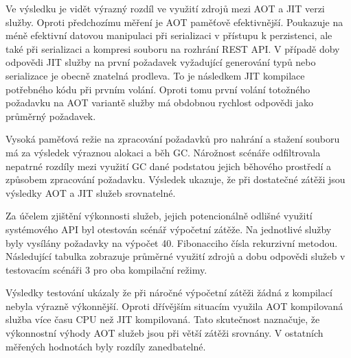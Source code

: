 Ve výsledku je vidět výrazný rozdíl ve využití zdrojů mezi AOT a JIT verzi služby. Oproti předchozímu měření je AOT paměťově efektivnější. Poukazuje na méně efektivní datovou manipulaci při serializaci v přístupu k perzistenci, ale také při serializaci a kompresi souboru na rozhrání REST API. V případě doby odpovědi JIT služby na první požadavek vyžadující generování typů nebo serializace je obecně znatelná prodleva. To je následkem JIT kompilace potřebného kódu při prvním volání. Oproti tomu první volání totožného požadavku na AOT variantě služby má obdobnou rychlost odpovědi jako průměrný požadavek.


Vysoká paměťová režie na zpracování požadavků pro nahrání a stažení souboru má za výsledek výraznou alokaci a běh GC. Nárožnost scénáře odfiltrovala nepatrné rozdíly mezi využití GC dané podstatou jejich běhového prostředí a způsobem zpracování požadavku. Výsledek ukazuje, že při dostatečné zátěži jsou výsledky AOT a JIT služeb srovnatelné.


Za účelem zjištění výkonnosti služeb, jejich potencionálně odlišné využití systémového API byl otestován scénář výpočetní zátěže. Na jednotlivé služby byly vysílány požadavky na výpočet 40. Fibonacciho čísla rekurzivní metodou. Následující tabulka zobrazuje průměrné využití zdrojů a dobu odpovědi služeb v testovacím scénáři 3 pro oba kompilační režimy.


Výsledky testování ukázaly že při náročné výpočetní zátěži žádná z kompilací nebyla výrazně výkonnější. Oproti dřívějším situacím využila AOT kompilovaná služba více času CPU než JIT kompilovaná. Tato skutečnost naznačuje, že výkonnostní výhody AOT služeb jsou při větší zátěži srovnány. V ostatních měřených hodnotách byly rozdíly zanedbatelné. 

